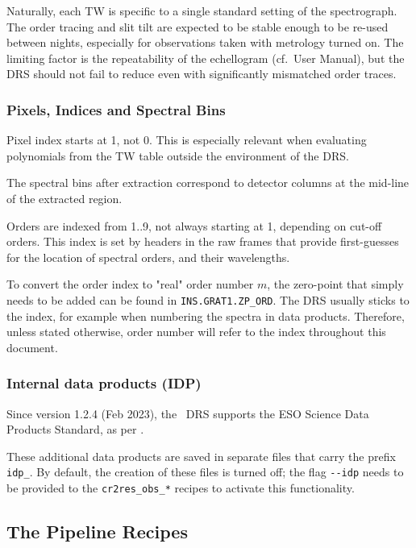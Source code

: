 Naturally, each TW is specific to a single standard setting of the spectrograph.
The order tracing and slit tilt are expected to be stable enough to be re-used
between nights, especially for observations taken with metrology turned on. The
limiting factor is the repeatability of the echellogram (cf.~User Manual), but
the DRS should not fail to reduce even with significantly mismatched order
traces.

\subsubsection{Pixels, Indices and Spectral Bins}
Pixel index starts at 1, not 0. This is especially relevant when evaluating
polynomials from the TW table outside the environment of the DRS.

The spectral bins after extraction correspond to detector columns at the
mid-line of the extracted region.

Orders are indexed from 1..9, not always starting at 1, depending on cut-off
orders. This index is set by headers in the raw frames that provide first-guesses
for the location of spectral orders, and their wavelengths.

To convert the order index to "real" order number $m$, the zero-point that
simply needs to be added can be found in \texttt{INS.GRAT1.ZP\_ORD}. The DRS
usually sticks to the index, for example when numbering the spectra in data
products. Therefore, unless stated otherwise, order number will refer to the
index throughout this document.

\subsubsection{Internal data products (IDP)}
\label{sec:idp}
Since version 1.2.4 (Feb 2023), the \instrument\ DRS supports the ESO Science
Data Products Standard, as per \cite{SDPSTD}.

These additional data products are saved in separate files that carry the prefix \verb!idp_!. By default, the creation of these files is turned off; the flag \verb!--idp! needs to be provided to the \verb!cr2res_obs_*! recipes to activate this functionality.

\subsection{The Pipeline Recipes}
\label{sec:recipes-quick}

